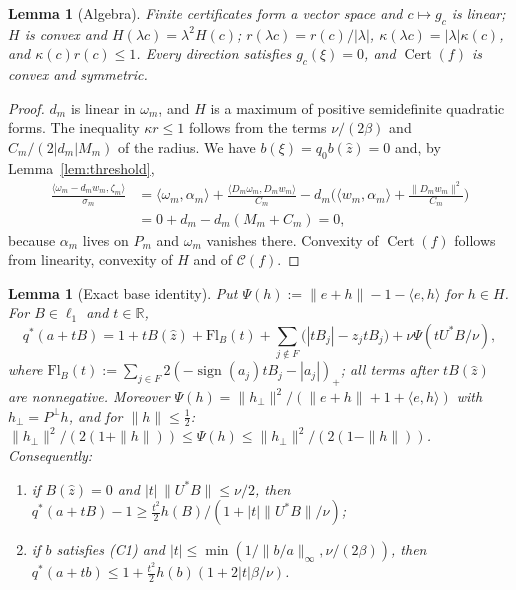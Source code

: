\documentclass[10pt]{amsart}
\newtheorem{lemma}[theorem]{Lemma}
\theoremstyle{definition}
\theoremstyle{remark}
\newcommand{\sgn}{\operatorname{sign}}
\newcommand{\R}{\mathbb R}
\newcommand{\Cset}{\mathcal C}
\newcommand{\Cert}{\operatorname{Cert}}
\newcommand{\zh}{\hat z}
\newcommand{\ip}[2]{\langle #1,#2\rangle}
\begin{document}
\begin{lemma}[Algebra]\label{lem:algebra}
Finite certificates form a vector space and $c\mapsto g_c$ is linear; $H$ is
convex and $H(\lambda c)=\lambda^2H(c)$; $r(\lambda c)=r(c)/|\lambda|$,
$\kappa(\lambda c)=|\lambda|\kappa(c)$, and $\kappa(c)r(c)\le1$.  Every
direction satisfies $g_c(\xi)=0$, and $\Cert(f)$ is convex and symmetric.
\end{lemma}

\begin{proof}
$d_m$ is linear in $\omega_m$, and $H$ is a maximum of positive
semidefinite quadratic forms.  The inequality $\kappa r\le1$ follows from
the terms $\nu/(2\beta)$ and $C_m/(2|d_m|M_m)$ of the radius.  We have
$b(\xi)=q_0b(\zh)=0$ and, by Lemma~\ref{lem:threshold},
\begin{align*}
 \frac{\ip{\omega_m-d_mw_m}{\zeta_m}}{\sigma_m}
 &=\ip{\omega_m}{\alpha_m}+\frac{\ip{D_m\omega_m}{D_mw_m}}{C_m}
 -d_m\Big(\ip{w_m}{\alpha_m}+\frac{\|D_mw_m\|^2}{C_m}\Big)\\
 &=0+d_m-d_m(M_m+C_m)=0,
\end{align*}
because $\alpha_m$ lives on $P_m$ and $\omega_m$ vanishes there.  Convexity
of $\Cert(f)$ follows from linearity, convexity of $H$ and of $\Cset(f)$.
\end{proof}

\begin{lemma}[Exact base identity]\label{lem:base}
Put $\Psi(h):=\|e+h\|-1-\ip{e}{h}$ for $h\in H$.  For $B\in\ell_1$ and
$t\in\R$,
\begin{equation}\label{eq:baseidentity}
 q^*(a+tB)=1+tB(\zh)+\mathrm{Fl}_B(t)+\sum_{j\notin F}\big(|tB_j|-z_jtB_j\big)
 +\nu\Psi(tU^*B/\nu),
\end{equation}
where $\mathrm{Fl}_B(t):=\sum_{j\in F}2(-\sgn(a_j)tB_j-|a_j|)_+$; all terms
after $tB(\zh)$ are nonnegative.  Moreover
$\Psi(h)=\|h_\perp\|^2/(\|e+h\|+1+\ip eh)$ with $h_\perp=P^\perp h$, and
for $\|h\|\le\frac12$:
$\|h_\perp\|^2/(2(1+\|h\|))\le\Psi(h)\le\|h_\perp\|^2/(2(1-\|h\|))$.
Consequently:
\begin{enumerate}
\item[(a)] if $B(\zh)=0$ and $|t|\,\|U^*B\|\le\nu/2$, then
$q^*(a+tB)-1\ge\frac{t^2}{2}h(B)/(1+|t|\|U^*B\|/\nu)$;
\item[(b)] if $b$ satisfies \textup{(C1)} and
$|t|\le\min(1/\|b/a\|_\infty,\nu/(2\beta))$, then
$q^*(a+tb)\le1+\frac{t^2}2h(b)(1+2|t|\beta/\nu)$.
\end{enumerate}
\end{lemma}
\end{document}
